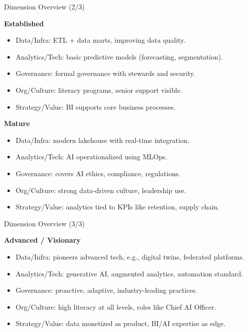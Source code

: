 \documentclass[aspectratio=169, table]{beamer}
\begin{document}
\begin{frame}{Dimension Overview (2/3)}
	\vspace{20pt}
	
	\textbf{Established}
	\begin{itemize}
		\item Data/Infra: ETL + data marts, improving data quality.
		\item Analytics/Tech: basic predictive models (forecasting, segmentation).
		\item Governance: formal governance with stewards and security.
		\item Org/Culture: literacy programs, senior support visible.
		\item Strategy/Value: BI supports core business processes.
	\end{itemize}
	
	\textbf{Mature}
	\begin{itemize}
		\item Data/Infra: modern lakehouse with real-time integration.
		\item Analytics/Tech: AI operationalized using MLOps.
		\item Governance: covers AI ethics, compliance, regulations.
		\item Org/Culture: strong data-driven culture, leadership use.
		\item Strategy/Value: analytics tied to KPIs like retention, supply chain.
	\end{itemize}
	
\end{frame}

\begin{frame}{Dimension Overview (3/3)}
	\vspace{20pt}
	
	\textbf{Advanced / Visionary}
	\begin{itemize}
		\item Data/Infra: pioneers advanced tech, e.g., digital twins, federated platforms.
		\item Analytics/Tech: generative AI, augmented analytics, automation standard.
		\item Governance: proactive, adaptive, industry-leading practices.
		\item Org/Culture: high literacy at all levels, roles like Chief AI Officer.
		\item Strategy/Value: data monetized as product, BI/AI expertise as edge.
	\end{itemize}
	
\end{frame}
\end{document}
